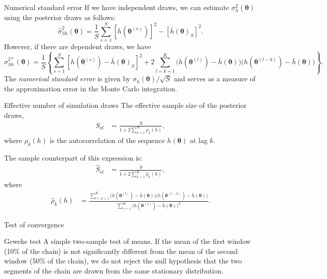 \documentclass[12pt, compress]{beamer}
\begin{document}
\begin{frame}{Numerical standard error}
If we have independent draws, we can estimate $\sigma^2_h(\bm{\theta})$ using the posterior draws as follows: 
\[
\hat{\sigma}^2_{Sh}(\bm{\theta}) = \frac{1}{S} \sum_{s=1}^S \left[h(\bm{\theta}^{(s)})\right]^2 - \left[\bar{h}(\bm{\theta})_S\right]^2.
\]
However, if there are dependent draws, we have
{\scriptsize{
\[
\hat{\sigma}^{2*}_{Sh}(\bm{\theta}) = \frac{1}{S} \left\{\sum_{s=1}^S \left[h(\bm{\theta}^{(s)})-\bar{h}(\bm{\theta})_S\right]^2 + 2\sum_{l=k+1}^K \big(h(\bm{\theta}^{(l)}) - \bar{h}(\bm{\theta})\big)\big(h(\bm{\theta}^{(l-k)}) - \bar{h}(\bm{\theta})\big)\right\}.
\]
}}
The \textit{numerical standard error} is given by $\sigma_h(\bm{\theta})/\sqrt{S}$ and serves as a measure of the approximation error in the Monte Carlo integration.
\end{frame}

\begin{frame}{Effective number of simulation draws}
The effective sample size of the posterior draws, 
\begin{align*}
	S_{\text{ef}} &= \frac{S}{1 + 2\sum_{k=1}^{\infty} \rho_k(h)},
\end{align*}
where $\rho_k(h)$ is the autocorrelation of the sequence $h(\bm{\theta})$ at lag $k$.

The sample counterpart of this expression is:
\begin{align*}
	\hat{S}_{\text{ef}} &= \frac{S}{1 + 2\sum_{k=1}^{K} \hat{\rho}_k(h)},
\end{align*}
where
\begin{align*}
	\hat{\rho}_k(h) &= \frac{\sum_{l=k+1}^K \big(h(\bm{\theta}^{(l)}) - \bar{h}(\bm{\theta})\big)\big(h(\bm{\theta}^{(l-k)}) - \bar{h}(\bm{\theta})\big)}{\sum_{s=1}^K \big(h(\bm{\theta}^{(s)}) - \bar{h}(\bm{\theta})\big)^2}.
\end{align*}
\end{frame}

\begin{frame}{Test of convergence}
\begin{block}{Geweke test}
	A simple two-sample test of means. If the mean of the first window (10\% of the chain) is not significantly different from the mean of the second window (50\% of the chain), we do not reject the null hypothesis that the two segments of the chain are drawn from the same stationary distribution.
\end{block}
\end{frame}
\end{document}
